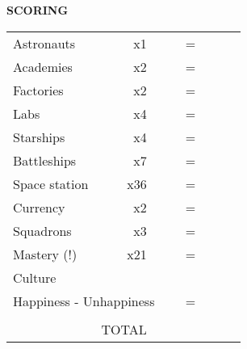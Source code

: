 \begin{flushleft}
  \textbf{SCORING}
\end{flushleft}
\begin{tabular}{lrllrlll}
Astronauts       & x1                   &           &  & =                     &  &                       &  \\ \cline{3-4} \cline{6-7}
Academies       & x2                   &           &  & =                     &  &                       &  \\ \cline{3-4} \cline{6-7}
Factories       & x2                   &           &  & =                     &  &                       &  \\ \cline{3-4} \cline{6-7}
Labs             & x4                   &           &  & =                     &  &                       &  \\ \cline{3-4} \cline{6-7}
Starships   & x4                   &           &  & =                     &  &                       &  \\ \cline{3-4} \cline{6-7}
Battleships    & x7                   &           &  & =                     &  &                       &  \\ \cline{3-4} \cline{6-7}
Space station      & x36                  &           &  & =                     &  &                       &  \\ \cline{3-4} \cline{6-7}
Currency        & x2                   &           &  & =                     &  &                       &  \\ \cline{3-4} \cline{6-7}
Squadrons      & x3                   &           &  & =                     &  &                       &  \\ \cline{3-4} \cline{6-7}
Mastery (!) & x21                  &           &  & =                     &  &                       &  \\ \cline{3-4} \cline{6-7}
Culture     &                      &           &  &                       &  &                       &  \\ \cline{6-7}
\multicolumn{4}{l}{Happiness - Unhappiness}       & =                     &  &                       &  \\ \cline{6-7}
            & \multicolumn{1}{l}{} &           &  & \multicolumn{1}{l}{}  &  &                       &  \\ \cline{6-7}
            & TOTAL                & \textbf{} &  & \multicolumn{1}{r|}{} &  & \multicolumn{1}{l|}{} &  \\ \cline{6-7}
\end{tabular}
